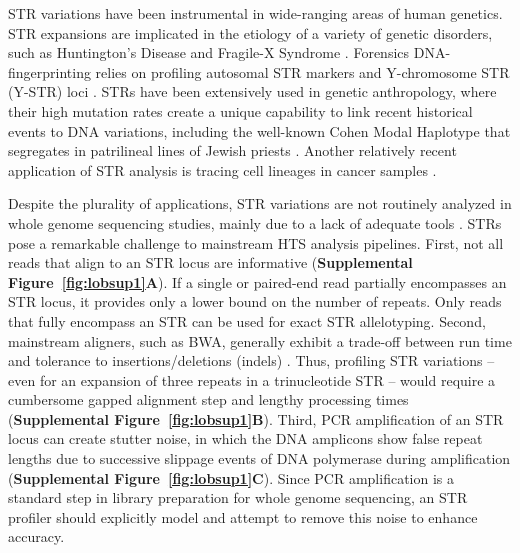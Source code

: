 STR variations have been instrumental in wide-ranging areas of human genetics. STR expansions are implicated in the etiology of a variety of genetic disorders, such as Huntington's Disease and Fragile-X Syndrome \cite{PearsonNicholEdamuraCleary2005,Mirkin2007}. Forensics DNA-fingerprinting relies on profiling autosomal STR markers and Y-chromosome STR (Y-STR) loci \cite{KayserKnijff2011}. STRs have been extensively used in genetic anthropology, where their high mutation rates create a unique capability to link recent historical events to DNA variations, including the well-known Cohen Modal Haplotype that segregates in patrilineal lines of Jewish priests \cite{SkoreckiSeligBlazerEtAl1997,ZhivotovskyUnderhillCinniogluEtAl2004}. Another relatively recent application of STR analysis is tracing cell lineages in cancer samples \cite{FrumkinWasserstromItzkovitzEtAl2008}.

Despite the plurality of applications, STR variations are not routinely analyzed in whole genome sequencing studies, mainly due to a lack of adequate tools \cite{TreangenSalzberg2012}. STRs pose a remarkable challenge to mainstream HTS analysis pipelines. First, not all reads that align to an STR locus are informative (\textbf{Supplemental Figure~\ref{fig:lobsup1}A}). If a single or paired-end read partially encompasses an STR locus, it provides only a lower bound on the number of repeats. Only reads that fully encompass an STR can be used for exact STR allelotyping. Second, mainstream aligners, such as BWA, generally exhibit a trade-off between run time and tolerance to insertions/deletions (indels) \cite{LiHomer2010}. Thus, profiling STR variations -- even for an expansion of three repeats in a trinucleotide STR -- would require a cumbersome gapped alignment step and lengthy processing times (\textbf{Supplemental Figure~\ref{fig:lobsup1}B}). Third, PCR amplification of an STR locus can create stutter noise, in which the DNA amplicons show false repeat lengths due to successive slippage events of DNA polymerase during amplification \cite{HaugeLitt1993,Ellegren2004} (\textbf{Supplemental Figure~\ref{fig:lobsup1}C}). Since PCR amplification is a standard step in library preparation for whole genome sequencing, an STR profiler should explicitly model and attempt to remove this noise to enhance accuracy.

